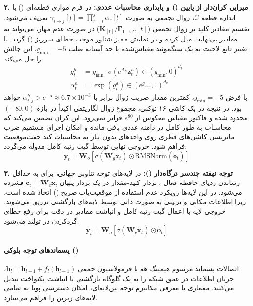 \textbf{۲. میرایی کران‌دار از پایین () و پایداری محاسبات عددی:}
در فرم موازی قطعه‌ای () با اندازه قطعه $C$، زوال تجمعی به صورت $\gamma_{i \to j}[t] = \prod_{r=i}^j \alpha_r[t]$ تعریف می‌شود. تقسیم مقادیر کلید بر زوال تجمعی ($\mathbf{K}_{[t]} / \mathbf{\Gamma}_{1 \to C}[t]$) در صورت عدم مهار، می‌تواند به مقادیر بی‌نهایت میل کرده و در نمایش ممیز شناور  موجب خطای سرریز () گردد.  با تغییر تابع لاجیت به یک سیگموئید مقیاس‌شده با حد آستانه صلب $g_{\min} = -5$، این چالش را حل می‌کند:
\begin{align}
    g_t^h &= g_{\min} \cdot \sigma\left(e^{A_h} \mathbf{z}_t^h\right) \in (g_{\min}, 0)^{d_k} \\
    \alpha_t^h &= \exp\left(g_t^h\right) \in \left(e^{g_{\min}}, 1\right)^{d_k}
\end{align}
با فرض $g_{\min} = -5$، کمترین مقدار ضریب زوال برابر با $\alpha_{t,j}^h > e^{-5} \approx 6.7 \times 10^{-3}$ خواهد بود. در نتیجه در یک کاشی ۱۶ توکنی، مجموع زوال لگاریتمی اکیداً در بازه $(-80, 0)$ محدود شده و فاکتور مقیاس معکوس از $e^{80}$ فراتر نمی‌رود. این کران تضمین می‌کند که محاسبات به طور کامل در دامنه عددی  باقی مانده و امکان اجرای مستقیم ضرب ماتریسی کاشی‌های قطری روی واحدهای  بدون نیاز به محاسبات کند جفت‌موقعیت فراهم شود. خروجی نهایی  توسط گیت رتبه-کامل مدوله می‌گردد:
\begin{equation}
    \mathbf{y}_t = \mathbf{W}_o \left[ \sigma\left(\mathbf{W}_g \mathbf{x}_t\right) \odot \text{RMSNorm}\left(\tilde{\mathbf{o}}_t\right) \right]
\end{equation}

\textbf{۳. توجه نهفته چندسر درگاه‌دار ():}
در لایه‌های توجه تناوبی جهانی، برای به حداقل رساندن ردپای حافظه فعال ، بردار کلید-مقدار در یک بردار پنهان $\mathbf{c}_t = \mathbf{W}_c \mathbf{x}_t$ فشرده می‌شود. در این لایه‌ها رویکرد عدم استفاده از موقعیت‌یاب صریح () اتخاذ شده است، زیرا اطلاعات مکانی و ترتیبی به صورت ذاتی توسط لایه‌های بازگشتی  تزریق می‌شوند. خروجی لایه با اعمال گیت رتبه-کامل و انباشت مقادیر در دقت  برای رفع خطای گردکردن در  \cite{qiu2026flash} تولید می‌شود:
\begin{equation}
    \mathbf{y}_t = \mathbf{W}_o \left[ \sigma\left(\mathbf{W}_g \mathbf{x}_t\right) \odot \tilde{\mathbf{o}}_t \right]
\end{equation}

\paragraph*{پسماندهای توجه بلوکی ()}
اتصالات پسماند مرسوم هیمینگ هه \cite{he2016deep} با فرمولاسیون جمعی $\mathbf{h}_l = \mathbf{h}_{l-1} + f_l(\mathbf{h}_{l-1})$، جریان اطلاعات در عمق شبکه را به یک گلوگاه بازگشتی با انباشت یکنواخت تبدیل می‌کنند. معماری  \cite{kimi2026attnres} با معرفی مکانیزم توجه بین‌لایه‌ای، امکان دسترسی پویا به تمامی لایه‌های زیرین را فراهم می‌سازد.

